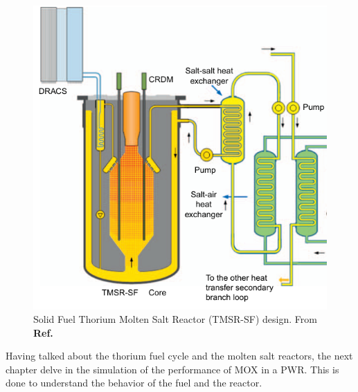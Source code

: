 \begin{figure}[H]
    \centering
    \includegraphics[scale=0.5]{Kap6/Figures_Kap6/TMSR-SF.png}
    \caption{Solid Fuel Thorium Molten Salt Reactor (TMSR-SF) design. From \textbf{Ref.} \cite{TMSR_book}}
    \label{fig:TMSR-SF}
\end{figure}

Having talked about the thorium fuel cycle and the molten salt reactors, the next chapter delve in the simulation of the performance of MOX in a PWR. This is done to understand the behavior of the fuel and the reactor.